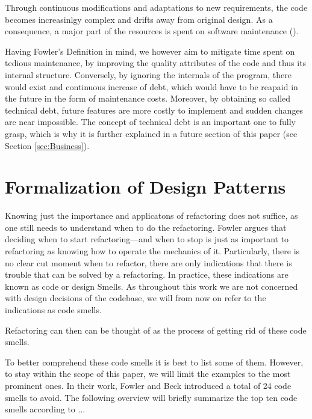 Through continuous modifications and adaptations to new requirements, the code becomes increasinlgy complex and drifts away from original design. 
As a consequence, 
	a major part of the resources is spent on software maintenance (\cite[p.~1]{mens2003}). 

Having Fowler's Definition in mind, 
	we however aim to mitigate time spent on tedious maintenance, 
	by improving the quality attributes of the code and thus its internal structure.
Conversely, by ignoring the internals of the program, 
	there would exist and continuous increase of debt, 
	which would have to be reapaid in the future in the form of maintenance costs.
Moreover, by obtaining so called technical debt, 
	future features are more costly to implement and sudden changes are near impossible. 
The concept of technical debt is an important one to fully grasp, 
	which is why it is further explained in a future section of this paper 
(see Section \ref{sec:Business}).
	



\section{Formalization of Design Patterns}

Knowing just the importance and applicatons of refactoring does not suffice, 
	as one still needs to understand when to do the refactoring.
Fowler \textcite{fowler2018} argues that deciding when to start refactoring—and when to stop 
	is just as important to refactoring as knowing how to operate the mechanics of it.
Particularly, there is no clear cut moment when to refactor, 
	there are only indications that there is trouble that can be solved by a refactoring.
In practice, these indications are known as code or design Smells.
As throughout this work we are not concerned with design decisions of the codebase, 
	we will from now on refer to the indications as code smells.

Refactoring can then can be thought of as the process of getting rid of these code smells. 

To better comprehend these code smells it is best to list some of them. 
However, to stay within the scope of this paper, 
	we will limit the examples to the most prominent ones. 
In their work, Fowler and Beck introduced a total of 24 code smells to avoid.
The following overview will briefly summarize the top ten code smells according to ...

